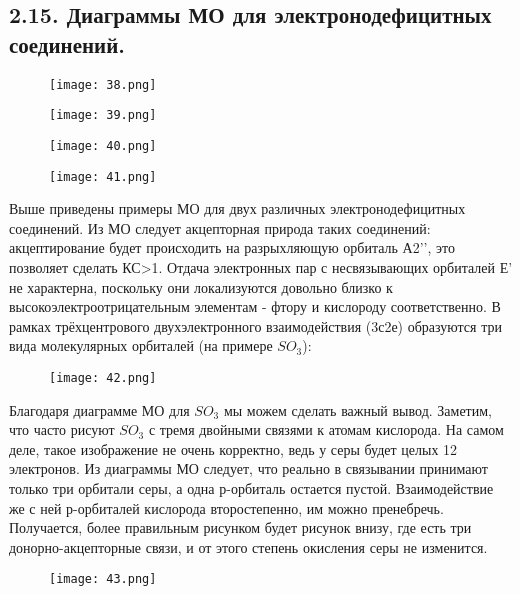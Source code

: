 	\subsection{2.15. Диаграммы МО для электронодефицитных соединений.} 
	
	\par\bigskip
	
	\begin{figure}[H]
		\centering
		{\texttt{[image: 38.png]}}
	\end{figure}
	
	\begin{figure}[H]
		\centering
		{\texttt{[image: 39.png]}}
	\end{figure}

\begin{figure}[H]
	\centering
	{\texttt{[image: 40.png]}}
\end{figure}

	\begin{figure}[H]
		\centering
		{\texttt{[image: 41.png]}}
	\end{figure}
	
	Выше приведены примеры МО для двух различных
	электронодефицитных соединений. Из МО следует
	акцепторная природа таких соединений: акцептирование
	будет происходить на разрыхляющую орбиталь А2’’, это
	позволяет сделать КС>1. Отдача электронных пар с
	несвязывающих орбиталей Е’ не характерна, поскольку они
	локализуются довольно близко к
	высокоэлектроотрицательным элементам - фтору и
	кислороду соответственно. В рамках трёхцентрового
	двухэлектронного взаимодействия (3с2е) образуются три
	вида молекулярных орбиталей (на примере $SO_3$):
	
	\begin{figure}[h]
		\centering
		{\texttt{[image: 42.png]}}
	\end{figure}
	
	Благодаря диаграмме МО для $SO_3$ мы можем сделать важный
	вывод. Заметим, что часто рисуют $SO_3$ с тремя двойными связями к
	атомам кислорода. На самом деле, такое изображение не очень
	корректно, ведь у серы будет целых 12 электронов. Из диаграммы
	МО следует, что реально в связывании принимают только три
	орбитали серы, а одна р-орбиталь остается пустой. Взаимодействие
	же с ней р-орбиталей кислорода второстепенно, им можно
	пренебречь. Получается, более правильным рисунком будет
	рисунок внизу, где есть три донорно-акцепторные связи, и от этого
	степень окисления серы не изменится.
	
	\begin{figure}[H]
		\centering
		{\texttt{[image: 43.png]}}
	\end{figure}
	
	\par\bigskip
	\par\bigskip
	